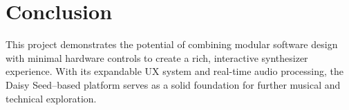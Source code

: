 \section{Conclusion}
This project demonstrates the potential of combining modular software design with minimal hardware controls to create a rich, interactive synthesizer experience. With its expandable UX system and real-time audio processing, the Daisy Seed–based platform serves as a solid foundation for further musical and technical exploration.
